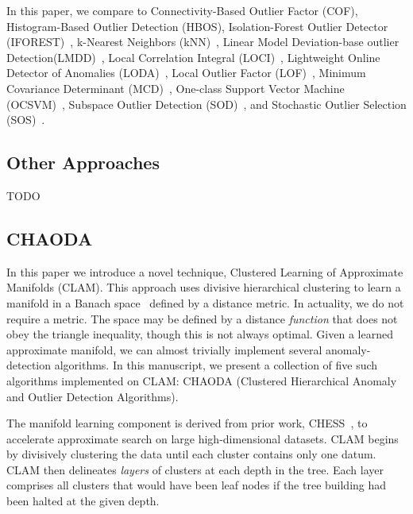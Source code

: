 In this paper, we compare to Connectivity-Based Outlier Factor (COF)\cite{tang2002cof}, Histogram-Based Outlier Detection (HBOS)\cite{goldstein2012hbos}, Isolation-Forest Outlier Detector (IFOREST)~\cite{tony2008iforest,tony2012iforest}, k-Nearest Neighbors (kNN)~\cite{ramaswamy2000efficient, sridhar2000knn, fabrizio2002knn}, Linear Model Deviation-base outlier Detection(LMDD)~\cite{arning1996lmdd}, Local Correlation Integral (LOCI)~\cite{papadimitriou2003loci}, Lightweight Online Detector of Anomalies (LODA)~\cite{pevny2016loda}, Local Outlier Factor (LOF)~\cite{breunig2000lof}, Minimum Covariance Determinant (MCD)~\cite{rousseeuw1999mcd,hardin2004mcd}, One-class Support Vector Machine (OCSVM)~\cite{sholkopf2001ocsvm}, Subspace Outlier Detection (SOD)~\cite{kriegel2009sod}, and Stochastic Outlier Selection (SOS)~\cite{janssens2012sos}.


\subsection{Other Approaches}
\label{subsec:introduction:oyher-appraoches}

TODO


\subsection{CHAODA}
\label{subsec:introduction:chaoda}

In this paper we introduce a novel technique, Clustered Learning of Approximate Manifolds (CLAM).
This approach uses divisive hierarchical clustering to learn a manifold in a Banach space~\cite{banach1929fonctionnelles} defined by a distance metric.
In actuality, we do not require a metric.
The space may be defined by a distance \textit{function} that does not obey the triangle inequality, though this is not always optimal.
Given a learned approximate manifold, we can almost trivially implement several anomaly-detection algorithms.
In this manuscript, we present a collection of five such algorithms implemented on CLAM: CHAODA (Clustered Hierarchical Anomaly and Outlier Detection Algorithms).

The manifold learning component is derived from prior work, CHESS~\cite{ishaq2019entropy}, to accelerate approximate search on large high-dimensional datasets.
CLAM begins by divisively clustering the data until each cluster contains only one datum.
CLAM then delineates \textit{layers} of clusters at each depth in the tree.
Each layer comprises all clusters that would have been leaf nodes if the tree building had been halted at the given depth.

